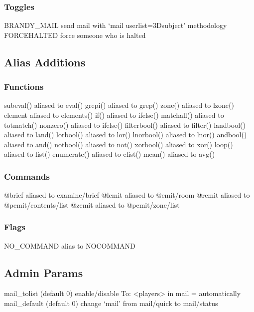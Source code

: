 \documentclass[letterpaper,10pt,english]{sphinxmanual}
\begin{document}
\subsubsection{Toggles}
\label{\detokenize{changelog:id88}}
\sphinxAtStartPar
BRANDY\_MAIL \sphinxhyphen{} send mail with ‘mail user\sphinxhyphen{}list=3Dsubject’ methodology
FORCEHALTED \sphinxhyphen{} force someone who is halted


\subsection{Alias Additions}
\label{\detokenize{changelog:id89}}

\subsubsection{Functions}
\label{\detokenize{changelog:id90}}
\sphinxAtStartPar
subeval() aliased to eval()
grepi() aliased to grep()
zone() aliased to lzone()
element aliased to elements()
if() aliased to ifelse()
matchall() aliased to totmatch()
nonzero() aliased to ifelse()
filterbool() aliased to filter()
landbool() aliased to land()
lorbool() aliased to lor()
lnorbool() aliased to lnor()
andbool() aliased to and()
notbool() aliased to not()
xorbool() aliased to xor()
loop() aliased to list()
enumerate() aliased to elist()
mean() aliased to avg()


\subsubsection{Commands}
\label{\detokenize{changelog:id91}}
\sphinxAtStartPar
@brief aliased to examine/brief
@lemit aliased to @emit/room
@remit aliased to @pemit/contents/list
@zemit aliased to @pemit/zone/list


\subsubsection{Flags}
\label{\detokenize{changelog:id92}}
\sphinxAtStartPar
NO\_COMMAND alias to NOCOMMAND


\subsection{Admin Params}
\label{\detokenize{changelog:id93}}
\sphinxAtStartPar
mail\_tolist (default 0) \sphinxhyphen{} enable/disable To: \textless{}players\textgreater{} in mail = automatically
mail\_default (default 0) \sphinxhyphen{} change ‘mail’ from mail/quick to mail/status
\end{document}
